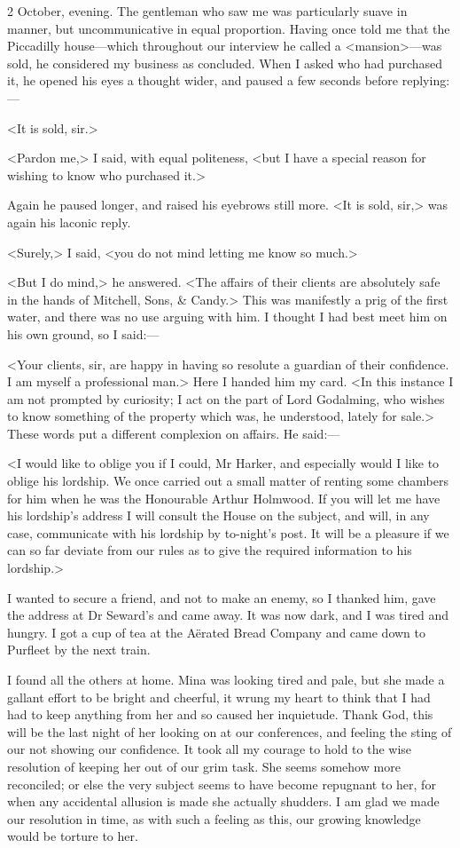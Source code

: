 \begin{diary}{2 October, evening.}
The gentleman who saw me was particularly suave in manner, but uncommunicative in equal proportion. Having once told me that the Piccadilly house—which throughout our interview he called a <mansion>—was sold, he considered my business as concluded. When I asked who had purchased it, he opened his eyes a thought wider, and paused a few seconds before replying:—

<It is sold, sir.>

<Pardon me,> I said, with equal politeness, <but I have a special reason for wishing to know who purchased it.>

Again he paused longer, and raised his eyebrows still more. <It is sold, sir,> was again his laconic reply.

<Surely,> I said, <you do not mind letting me know so much.>

<But I do mind,> he answered. <The affairs of their clients are absolutely safe in the hands of Mitchell, Sons, \& Candy.> This was manifestly a prig of the first water, and there was no use arguing with him. I thought I had best meet him on his own ground, so I said:—

<Your clients, sir, are happy in having so resolute a guardian of their confidence. I am myself a professional man.> Here I handed him my card. <In this instance I am not prompted by curiosity; I act on the part of Lord Godalming, who wishes to know something of the property which was, he understood, lately for sale.> These words put a different complexion on affairs. He said:—

<I would like to oblige you if I could, Mr Harker, and especially would I like to oblige his lordship. We once carried out a small matter of renting some chambers for him when he was the Honourable Arthur Holmwood. If you will let me have his lordship's address I will consult the House on the subject, and will, in any case, communicate with his lordship by to-night's post. It will be a pleasure if we can so far deviate from our rules as to give the required information to his lordship.>

I wanted to secure a friend, and not to make an enemy, so I thanked him, gave the address at Dr Seward's and came away. It was now dark, and I was tired and hungry. I got a cup of tea at the Aërated Bread Company and came down to Purfleet by the next train.

I found all the others at home. Mina was looking tired and pale, but she made a gallant effort to be bright and cheerful, it wrung my heart to think that I had had to keep anything from her and so caused her inquietude. Thank God, this will be the last night of her looking on at our conferences, and feeling the sting of our not showing our confidence. It took all my courage to hold to the wise resolution of keeping her out of our grim task. She seems somehow more reconciled; or else the very subject seems to have become repugnant to her, for when any accidental allusion is made she actually shudders. I am glad we made our resolution in time, as with such a feeling as this, our growing knowledge would be torture to her.


\end{diary}
